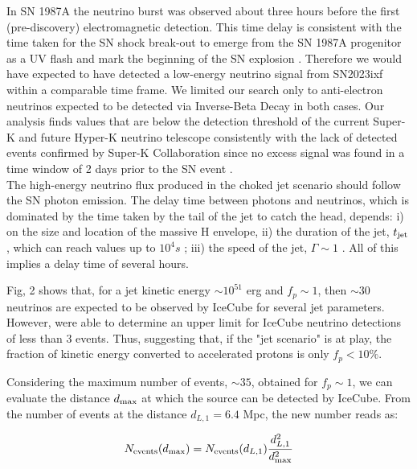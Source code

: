\documentclass[twocolumn]{aastex631}
\begin{document}
In SN 1987A the neutrino burst was observed about three hours before the first (pre-discovery) electromagnetic detection. This time delay is consistent with the time taken for the SN shock break-out to emerge from the SN 1987A progenitor as a UV flash and mark the beginning of the SN explosion \citep{Arnett1987}. Therefore we would have expected to have detected a low-energy neutrino signal from SN2023ixf within a comparable time frame. We limited our search only to anti-electron neutrinos expected to be detected via Inverse-Beta Decay in both cases. Our analysis finds values that are below the detection threshold of the current Super-K and future Hyper-K neutrino telescope consistently with the lack of detected events confirmed by Super-K Collaboration since no excess signal was found in a time window of 2 days prior to the SN event \citep{atel_sk}.\\

The high-energy neutrino flux produced in the choked jet scenario should follow the SN photon emission. The delay time between photons and neutrinos, which is dominated by the time taken by the tail of the jet to catch the head, depends: i) on the size and location of the massive H envelope, ii) the duration of the jet, $t_{\rm jet}$, which can reach values up to $10^{4}s$  \citep{Stratta2015}; iii) the speed of the jet, $\Gamma \sim 1$ \citep{Izzo2019}. All of this implies a delay time of several hours. 




Fig, 2 shows that, for a jet kinetic energy $\sim 10^{51}$ erg and $f_p\sim1$, then $\sim 30$ neutrinos are expected to be observed by IceCube for several jet parameters. However, \citep{IceCubeSN2023} were able to determine an upper limit for IceCube neutrino detections of less than 3 events. Thus, suggesting that, if the "jet scenario" is at play, the fraction of kinetic energy converted to accelerated protons is only $f_p<10\%$.



Considering the maximum number of events, $\sim 35$, obtained for $f_p\sim 1$, we can evaluate the distance $d_{\rm max}$ at which the source can be detected by IceCube. From the number of events at the distance $d_{L,1}= 6.4 $ Mpc, the new number reads as:

\begin{equation}
    N_{\rm events}(d_{\rm max})=   N_{\rm events}(d_{L,1}) \frac{d_{L,1}^2}{d_{\rm max}^2} 
\end{equation}
\end{document}
